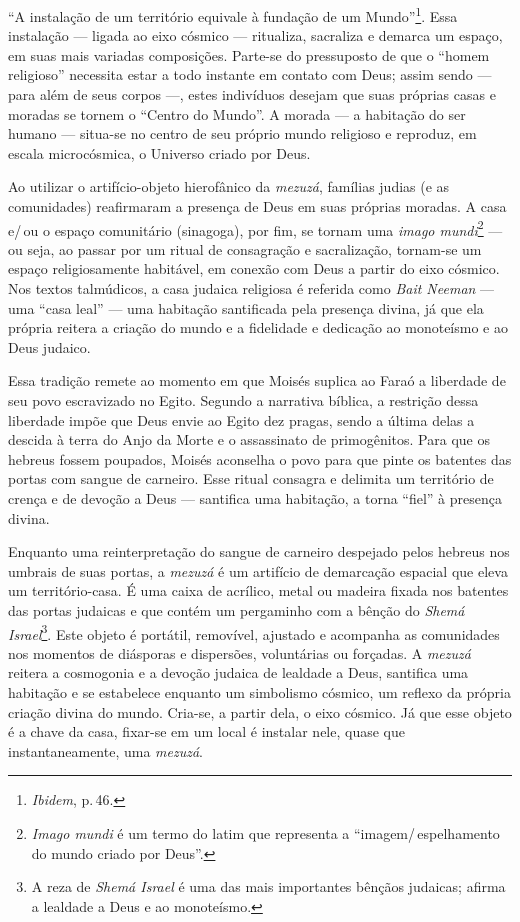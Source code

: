 ``A instalação de um território equivale à fundação de um
Mundo''\footnote{\emph{Ibidem}, p.\,46.}. Essa instalação --- ligada ao eixo
cósmico --- ritualiza, sacraliza e demarca um espaço, em suas mais
variadas composições. Parte-se do pressuposto de que o ``homem
religioso'' necessita estar a todo instante em contato com Deus; assim
sendo --- para além de seus corpos ---, estes indivíduos desejam que
suas próprias casas e moradas se tornem o ``Centro do Mundo''. A morada
--- a habitação do ser humano --- situa-se no centro de seu próprio
mundo religioso e reproduz, em escala microcósmica, o Universo criado
por Deus.

Ao utilizar o artifício-objeto hierofânico da \emph{mezuzá}, famílias
judias (e as comunidades) reafirmaram a presença de Deus em suas
próprias moradas. A casa e/\,ou o espaço comunitário (sinagoga), por fim,
se tornam uma \emph{imago mundi}\footnote{\emph{Imago mundi} é um termo
  do latim que representa a ``imagem/\,espelhamento do mundo criado por
  Deus''.} --- ou seja, ao passar por um ritual de consagração e
sacralização, tornam-se um espaço religiosamente habitável, em conexão
com Deus a partir do eixo cósmico. Nos textos talmúdicos, a casa
judaica religiosa é referida como \emph{Bait Neeman} --- uma ``casa
leal'' --- uma habitação santificada pela presença divina, já que ela
própria reitera a criação do mundo e a fidelidade e dedicação ao
monoteísmo e ao Deus judaico.

Essa tradição remete ao momento em que Moisés suplica ao Faraó a
liberdade de seu povo escravizado no Egito. Segundo a narrativa bíblica,
a restrição dessa liberdade impõe que Deus envie ao Egito dez pragas,
sendo a última delas a descida à terra do Anjo da Morte e o assassinato
de primogênitos. Para que os hebreus fossem poupados, Moisés aconselha o
povo para que pinte os batentes das portas com sangue de carneiro. Esse
ritual consagra e delimita um território de crença e de devoção a Deus
--- santifica uma habitação, a torna ``fiel'' à presença divina.

Enquanto uma reinterpretação do sangue de carneiro despejado pelos
hebreus nos umbrais de suas portas, a \emph{mezuzá} é um artifício de
demarcação espacial que eleva um território-casa. É uma caixa de
acrílico, metal ou madeira fixada nos batentes das portas judaicas e que
contém um pergaminho com a bênção do \emph{Shemá Israel}\footnote{A reza
  de \emph{Shemá Israel} é uma das mais importantes bênçãos judaicas;
  afirma a lealdade a Deus e ao monoteísmo.}. Este objeto é portátil,
removível, ajustado e acompanha as comunidades nos momentos de diásporas
e dispersões, voluntárias ou forçadas. A \emph{mezuzá} reitera a
cosmogonia e a devoção judaica de lealdade a Deus, santifica uma
habitação e se estabelece enquanto um simbolismo cósmico, um reflexo da
própria criação divina do mundo. Cria-se, a partir dela, o eixo cósmico.
Já que esse objeto é a chave da casa, fixar-se em um local é instalar
nele, quase que instantaneamente, uma \emph{mezuzá}.

